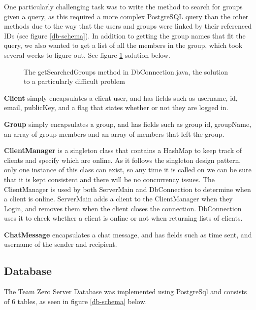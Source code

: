 One particularly challenging task was to write the method to search for groups given a query, as this required a more complex PostgreSQL query than the other methods due to the way that the users and groups were linked by their referenced IDs (see figure \ref{db-schema}). In addition to getting the group names that fit the query, we also wanted to get a list of all the members in the group, which took several weeks to figure out. See figure \ref{search-group} solution below.

\begin{figure}[H]
  \caption{The getSearchedGroups method in DbConnection.java, the solution to a particularly difficult problem}
  \label{search-group}
\end{figure}


\textbf{Client} simply encapsulates a client user, and has fields such as username, id, email, publicKey, and a flag that states whether or not they are logged in.

\textbf{Group} simply encapsulates a group, and has fields such as group id, groupName, an array of group members and an array of members that left the group.

\textbf{ClientManager} is a singleton class that contains a HashMap to keep track of clients and specify which are online. As it follows the singleton design pattern, only one instance of this class can exist, so any time it is called on we can be sure that it is kept consistent and there will be no concurrency issues. The ClientManager is used by both ServerMain and DbConnection to determine when a client is online. ServerMain adds a client to the ClientManager when they Login, and removes them when the client closes the connection. DbConnection uses it to check whether a client is online or not when returning lists of clients. 

\textbf{ChatMessage} encapsulates a chat message, and has fields such as time sent, and username of the sender and recipient. 


\subsection{Database}

The Team Zero Server Database was implemented using PostgreSql and consists of 6 tables, as seen in figure \ref{db-schema} below.

